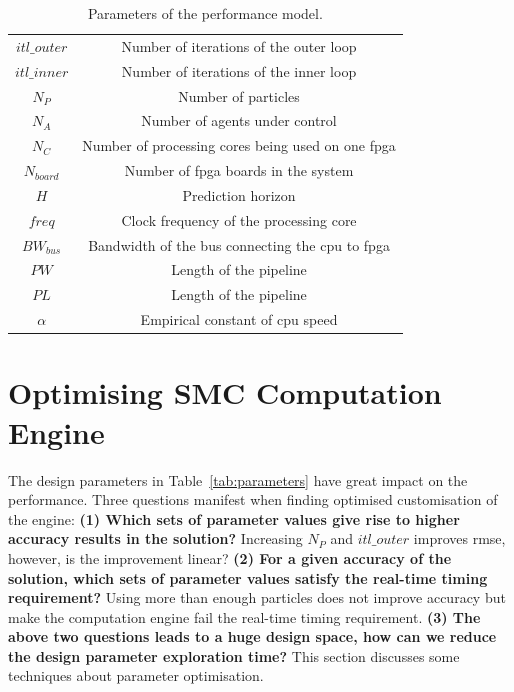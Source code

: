 \begin{table}
	\setlength{\tabcolsep}{3pt}
	\begin{spacing}{1.0}
	\caption{Parameters of the performance model.}
	\label{tab:reconfig_parameters_tool}
	\footnotesize
	\centering
	\smallskip
		\begin{tabular}{c|c}
			\hline
			$itl\_outer$ & Number of iterations of the outer loop \\
			$itl\_inner$ & Number of iterations of the inner loop \\
			$N_P$ & Number of particles \\
			$N_A$ & Number of agents under control \\
			$N_C$ & Number of processing cores being used on one \gls{fpga} \\
			$N_{board}$ & Number of \gls{fpga} boards in the system \\
			$H$ & Prediction horizon \\
			$\mathit{freq}$ & Clock frequency of the processing core \\
			$BW_{bus}$ & Bandwidth of the bus connecting the \gls{cpu} to \gls{fpga} \\
			$PW$ & Length of the pipeline \\
			$PL$ & Length of the pipeline \\
			$\alpha$ & Empirical constant of \gls{cpu} speed \\
			\hline
		\end{tabular}
		\end{spacing}
\end{table}


\section{Optimising SMC Computation Engine}
\label{sec:flow_optimisation}

The design parameters in Table~\ref{tab:parameters} have great impact on the performance.
Three questions manifest when finding optimised customisation of the engine:
\textbf{(1) Which sets of parameter values give rise to higher accuracy results in the solution?}
Increasing $N_P$ and $itl\_outer$ improves \gls{rmse}, however, is the improvement linear?
\textbf{(2) For a given accuracy of the solution, which sets of parameter values satisfy the real-time timing requirement?}
Using more than enough particles does not improve accuracy but make the computation engine fail the real-time timing requirement.
\textbf{(3) The above two questions leads to a huge design space, how can we reduce the design parameter exploration time?}
This section discusses some techniques about parameter optimisation.

